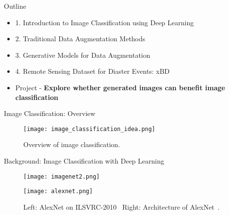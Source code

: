 
\begin{refsection}
  \begin{frame}{Outline}
    \begin{itemize}
      \item 1. Introduction to Image Classification using Deep Learning
      \item 2. Traditional Data Augmentation Methods
      \item 3. Generative Models for Data Augmentation
      \item 4. Remote Sensing Dataset for Diaster Events: xBD
    \end{itemize}
    \begin{itemize}
      \item Project - \textbf{Explore whether generated images can benefit image classification}
    \end{itemize}
  \end{frame}
\end{refsection}


\begin{refsection}
  \begin{frame}{Image Classification: Overview}
    \begin{figure}
      \centering
      \texttt{[image: image\_classification\_idea.png]}
      \caption{\scriptsize Overview of image classification.}
    \end{figure}
    \bottomleftrefs
  \end{frame}
\end{refsection}

\begin{refsection}
  \begin{frame}{Background: Image Classification with Deep Learning}
    \begin{figure}
      \centering
      \begin{minipage}{0.48\linewidth}
        \centering
        \texttt{[image: imagenet2.png]}
      \end{minipage}\hfill
      \begin{minipage}{0.48\linewidth}
        \centering
        \texttt{[image: alexnet.png]}
      \end{minipage}
      \caption[]{\scriptsize Left: AlexNet on ILSVRC-2010~\parencite{imagenet2010challenge} \quad Right: Architecture of AlexNet~\parencite{krizhevskyImageNetClassificationDeep2012}.}
    \end{figure}
    \bottomleftrefs
  \end{frame}
\end{refsection}

